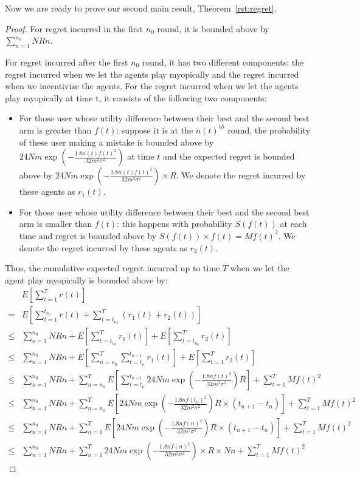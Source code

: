 \documentclass{article}
\begin{document}
Now we are ready to prove our second main result, Theorem~\ref{rst:regret}.

\begin{proof}
For regret incurred in the first $n_0$ round, it is bounded above by $\sum_{n=1}^{n_{0}}NRn$.

For regret incurred after the first $n_0$ round, it has two different components: the regret incurred when we let the agents play myopically and the regret incurred when we incentivize the agents. For the regret incurred when we let the agents play myopically at time t, it consists of the following two components:
\begin{itemize}
\item For those user whose utility difference between their best and the second best arm is greater than $f(t)$: suppose it is at the $n(t)^{th}$ round, the probability of these user making a mistake is bounded above by $24Nm\exp\left(-\frac{1.8n(t) f(t)^2}{32 m^2\sigma^2}\right)$ at time $t$ and the expected regret is bounded above by $24Nm\exp\left(-\frac{1.8n(t) f(t)^2}{32 m^2\sigma^2}\right)\times R$. We denote the regret incurred by these agents as $r_1(t)$.
\item For those user whose utility difference between their best and the second best arm is smaller than $f(t)$: this happens with probability $S(f(t))$ at each time and regret is bounded above by $S(f(t)) \times f(t)=Mf(t)^2$. We denote the regret incurred by these agents as $r_2(t)$.
\end{itemize}

Thus, the cumulative expected regret incurred up to time $T$ when we let the agent play myopically is bounded above by:
\begin{align}
&E\left[\sum_{t=1}^{T}r(t)\right] \nonumber \\
=&E\left[\sum_{t=1}^{t_{n_{0}}} r(t) + \sum_{t=t_{n_{0}}}^{T}(r_1(t)+r_2(t))\right]  \nonumber \\
\leq & \sum_{n=1}^{n_{0}}NRn + E\left[\sum_{t=t_{n_{0}}}^{T}r_1(t)\right]+ E\left[\sum_{t=t_{n_{0}}}^{T}r_2(t)\right] \nonumber \\
\leq & \sum_{n=1}^{n_{0}}NRn + E\left[\sum_{n=n_{0}}^{T}\sum_{t=t_{n}}^{t_{n+1}}r_1(t)\right]+ E\left[\sum_{t=1}^{T}r_2(t)\right] \nonumber \\
\leq & \sum_{n=1}^{n_{0}}NRn + \sum_{n=n_{0}}^{T}E\left[\sum_{t=t_{n}}^{t_{n+1}}24Nm\exp\left(-\frac{1.8n f(t)^2}{32 m^2\sigma^2}\right) R\right]+ \sum_{t=1}^{T}Mf(t)^2 \nonumber \\
\leq & \sum_{n=1}^{n_{0}}NRn + \sum_{n=n_{0}}^{T}E\left[24Nm\exp\left(-\frac{1.8n f(t_n)^2}{32 m^2\sigma^2}\right)R \times (t_{n+1}-t_{n})\right]+ \sum_{t=1}^{T}Mf(t)^2 \nonumber \\
\leq & \sum_{n=1}^{n_{0}}NRn + \sum_{n=1}^{T}E\left[24Nm\exp\left(-\frac{1.8n f(n)^2}{32 m^2\sigma^2}\right)R\times (t_{n+1}-t_{n})\right]+ \sum_{t=1}^{T}Mf(t)^2 \nonumber \\
\leq & \sum_{n=1}^{n_{0}}NRn + \sum_{n=1}^{T} 24Nm\exp\left(-\frac{1.8n f(n)^2}{32 m^2\sigma^2}\right)\times R \times Nn+ \sum_{t=1}^{T}Mf(t)^2 \label{equ:regret}
\end{align}


\end{proof}
\end{document}
